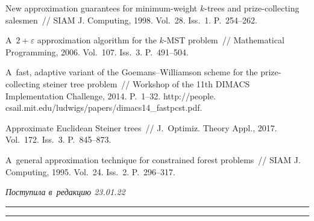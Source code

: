\begin{multicols}{2}
{{\begin{thebibliography}{99}
 New approximation guarantees 
for minimum-weight $k$-trees and prize-collecting salesmen~// SIAM J. 
Computing, 1998. Vol.~28. Iss.~1. P.~254--262.

 A~$2+\varepsilon$ approximation algorithm for the 
$k$-MST problem~// Mathematical Programming, 2006. Vol.~107. 
Iss.~3. P.~491--504.

 A~fast, adaptive variant of the 
Goemans--Williamson scheme for the prize-collecting steiner tree problem~// Workshop of 
the 11th DIMACS Implementation Challenge, 2014. P.~1--32.
{\sf http://people. csail.mit.edu/ludwigs/papers/dimacs14\_fastpcst.pdf}.

 Approximate Euclidean Steiner 
trees~// J.~Optimiz. Theory Appl., 2017. Vol.~172. 
Iss.~3. P.~845--873.

 A~general approximation technique for 
constrained forest problems~// SIAM J. Computing, 1995. Vol.~24. 
Iss.~2. P.~296--317.
\end{thebibliography}

 }
 }

\end{multicols}

\vspace*{-6pt}

\hfill{\small\textit{Поступила в~редакцию 23.01.22}}

\vspace*{8pt}




\hrule

\vspace*{2pt}

\hrule


\def\tit{OPTIMAL SPANNING TREE RECONSTRUCTION IN~SYMBOLIC REGRESSION}


\def\titkol{Optimal spanning tree reconstruction in~symbolic regression}


\def\aut{R.\,G.~Neychev$^1$, I.\,A.~Shibaev$^1$, and~V.\,V.~Strijov$^2$}

